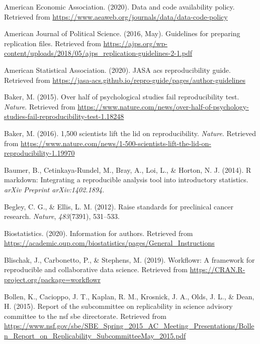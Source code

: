 \documentclass[12pt,twoside]{reedthesis}
\begin{document}

\noindent

\setlength{\parindent}{-0.20in} \setlength{\leftskip}{0.20in}
\setlength{\parskip}{8pt}

\hypertarget{refs}{}
\hypertarget{ref-aee-policy}{}
American Economic Association. (2020). Data and code availability
policy. Retrieved from
\url{https://www.aeaweb.org/journals/data/data-code-policy}

\hypertarget{ref-ajps-guidelines}{}
American Journal of Political Science. (2016, May). Guidelines for
preparing replication files. Retrieved from
\url{https://ajps.org/wp-content/uploads/2018/05/ajps_replication-guidelines-2-1.pdf}

\hypertarget{ref-asa-guide}{}
American Statistical Association. (2020). JASA acs reproducibility
guide. Retrieved from
\url{https://jasa-acs.github.io/repro-guide/pages/author-guidelines}

\hypertarget{ref-nature-psych}{}
Baker, M. (2015). Over half of psychological studies fail
reproducibility test. \emph{Nature}. Retrieved from
\url{https://www.nature.com/news/over-half-of-psychology-studies-fail-reproducibility-test-1.18248}

\hypertarget{ref-nature-crisis}{}
Baker, M. (2016). 1,500 scientists lift the lid on reproducibility.
\emph{Nature}. Retrieved from
\url{https://www.nature.com/news/1-500-scientists-lift-the-lid-on-reproducibility-1.19970}

\hypertarget{ref-baumer2014r}{}
Baumer, B., Cetinkaya-Rundel, M., Bray, A., Loi, L., \& Horton, N. J.
(2014). R markdown: Integrating a reproducible analysis tool into
introductory statistics. \emph{arXiv Preprint arXiv:1402.1894}.

\hypertarget{ref-begley2012raise}{}
Begley, C. G., \& Ellis, L. M. (2012). Raise standards for preclinical
cancer research. \emph{Nature}, \emph{483}(7391), 531--533.

\hypertarget{ref-journal-biostats}{}
Biostatistics. (2020). Information for authors. Retrieved from
\url{https://academic.oup.com/biostatistics/pages/General_Instructions}

\hypertarget{ref-R-workflowr}{}
Blischak, J., Carbonetto, P., \& Stephens, M. (2019). Workflowr: A
framework for reproducible and collaborative data science. Retrieved
from \url{https://CRAN.R-project.org/package=workflowr}

\hypertarget{ref-arlington}{}
Bollen, K., Cacioppo, J. T., Kaplan, R. M., Krosnick, J. A., Olds, J.
L., \& Dean, H. (2015). Report of the subcommittee on replicability in
science advisory committee to the nsf sbe directorate. Retrieved from
\url{https://www.nsf.gov/sbe/SBE_Spring_2015_AC_Meeting_Presentations/Bollen_Report_on_Replicability_SubcommitteeMay_2015.pdf}
\end{document}
